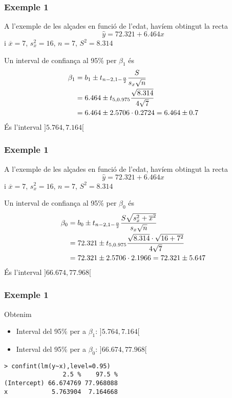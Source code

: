 \documentclass[12pt,t]{beamer}
\theoremstyle{plain}
\theoremstyle{definition}
\begin{document}
\begin{frame}
\frametitle{Exemple 1}
\vspace*{-2ex}

A l'exemple de les alçades en funció de l'edat, havíem obtingut la recta
$$
\widehat{y}=72.321+6.464x
$$
i $\overline{x}=7$, $s_x^2=16$, $n=7$, $S^2=8.314$
\medskip

Un interval de confiança al 95\% per $\beta_1$ és
$$
\begin{array}{l}
\displaystyle \beta_1=b_1\pm t_{n-2,1-\frac{\alpha}{2}} \frac{S}{s_x\sqrt{n}}
\\[2ex]
\displaystyle\hphantom{\beta_1} =6.464\pm t_{5,0.975} \frac{\sqrt{8.314}}{4\sqrt{7}}\\[2ex]
\hphantom{\beta_1} =
6.464\pm 2.5706 \cdot 0.2724=6.464\pm  0.7
\end{array}
$$
És l'interval $]5.764,7.164[$
\end{frame}

\begin{frame}
\frametitle{Exemple 1}
\vspace*{-2ex}

A l'exemple de les alçades en funció de l'edat, havíem obtingut la recta
$$
\widehat{y}=72.321+6.464x
$$
i $\overline{x}=7$, $s_x^2=16$, $n=7$, $S^2=8.314$
\medskip

Un interval de confiança al 95\% per $\beta_0$ és
$$
\begin{array}{l}
\displaystyle \beta_0=b_0\pm t_{n-2,1-\frac{\alpha}{2}}\frac{S\sqrt{s_x^2+\overline{x}^2}}{s_x\sqrt{n}}
\\[2ex]
\displaystyle\hphantom{\beta_0}=72.321\pm t_{5,0.975} \frac{\sqrt{8.314}\cdot\sqrt{16+7^2}}{4\sqrt{7}}\\[2ex]
\hphantom{\beta_0} =
72.321\pm 2.5706 \cdot 2.1966=72.321\pm 5.647
\end{array}
$$
És l'interval $]66.674,77.968[$

\end{frame}






\begin{frame}[fragile]
\frametitle{Exemple 1}
\vspace*{-2ex}

Obtenim
\begin{itemize}
\item Interval del 95\% per a $\beta_1$: $]5.764,7.164[$
\medskip

\item Interval del 95\% per a $\beta_0$: $]66.674,77.968[$
\end{itemize}
\begin{verbatim}
> confint(lm(y~x),level=0.95)
                2.5 %    97.5 %
(Intercept) 66.674769 77.968088
x            5.763904  7.164668
\end{verbatim}

\end{frame}
\end{document}

